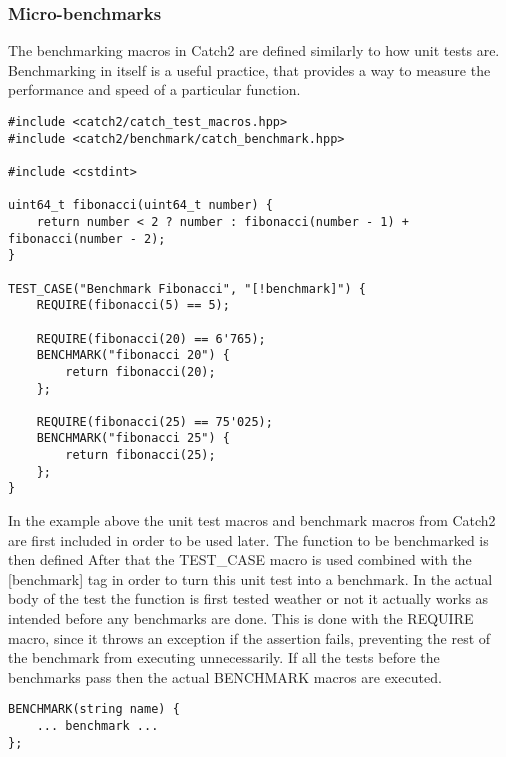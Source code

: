 \subsubsection{Micro-benchmarks}
The benchmarking macros in Catch2 are defined similarly to how unit tests are. Benchmarking in itself is a useful practice, that provides a way to measure the performance
and speed of a particular function.

\begin{verbatim}
#include <catch2/catch_test_macros.hpp>
#include <catch2/benchmark/catch_benchmark.hpp>

#include <cstdint>

uint64_t fibonacci(uint64_t number) {
    return number < 2 ? number : fibonacci(number - 1) + fibonacci(number - 2);
}

TEST_CASE("Benchmark Fibonacci", "[!benchmark]") {
    REQUIRE(fibonacci(5) == 5);

    REQUIRE(fibonacci(20) == 6'765);
    BENCHMARK("fibonacci 20") {
        return fibonacci(20);
    };

    REQUIRE(fibonacci(25) == 75'025);
    BENCHMARK("fibonacci 25") {
        return fibonacci(25);
    };
}
\end{verbatim}

In the example above the unit test macros and benchmark macros from Catch2 are first included in order to be used later. The function to be benchmarked is then defined
After that the TEST\_CASE macro is used combined with the [\!benchmark] tag in order to turn this unit test into a benchmark. In the actual body of the test the function
is first tested weather or not it actually works as intended before any benchmarks are done. This is done with the REQUIRE macro, since it throws an exception if the 
assertion fails, preventing the rest of the benchmark from executing unnecessarily. If all the tests before the benchmarks pass then the actual BENCHMARK macros are
executed.

\begin{verbatim}
BENCHMARK(string name) {
    ... benchmark ...
};
\end{verbatim}

